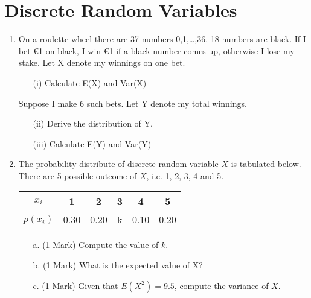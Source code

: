 \documentclass[]{report}
\begin{document}
\section*{Discrete Random Variables}
	\begin{enumerate}
		\item  On a roulette wheel there are 37 numbers {0,1,…,36}. 18 numbers are black. If I bet €1 on black, I win €1 if a black number comes up, otherwise I lose my stake. Let X denote my winnings on one bet.
		\begin{itemize}
		\item[(i)]	Calculate E(X) and Var(X)
		\end{itemize}
		
		
		Suppose I make 6 such bets. Let Y denote my total winnings. 
	\begin{itemize}
		\item[(ii)]	Derive the distribution of Y.
	\item[(iii)]	Calculate E(Y) and Var(Y)
	\end{itemize}	

\item The probability distribute of discrete random variable $X$ is tabulated below. There are 5 possible outcome of $X$, i.e. 1, 2, 3, 4 and 5.
	\begin{center}
		\begin{tabular}{|c||c|c|c|c|c|}
			\hline
			$x_i$  & 1 & 2 & 3 & 4 & 5  \\\hline
			$p(x_i)$ & 0.30 & 0.20 & k & 0.10 & 0.20 \\
			\hline
		\end{tabular}
	\end{center}
	
	\begin{itemize}
		\item[a.] (1 Mark) Compute the value of $k$.
		\item[b.] (1 Mark) What is the expected value of X?
		\item[c.] (1 Mark) Given that $E(X^2) = 9.5$, compute the variance of $X$.
	\end{itemize}
	\end{enumerate}
\end{document}

